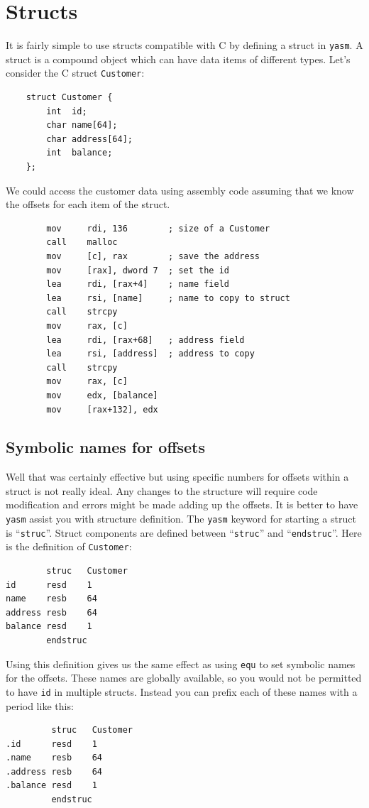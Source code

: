 \documentclass[11pt,b5paper]{book}
\begin{document}
\chapter{Structs}

It is fairly simple to use structs compatible with C by defining a struct in {\tt yasm}. 
A struct is a compound object which can have data items of different types.
Let's consider the C struct {\tt Customer}:
\begin{verbatim}
    struct Customer {
        int  id;
        char name[64];
        char address[64];
        int  balance;
    };
\end{verbatim}

We could access the customer data using assembly code assuming that we know the offsets for each item of the
struct.
\begin{verbatim}
        mov     rdi, 136        ; size of a Customer
        call    malloc
        mov     [c], rax        ; save the address
        mov     [rax], dword 7  ; set the id
        lea     rdi, [rax+4]    ; name field
        lea     rsi, [name]     ; name to copy to struct
        call    strcpy
        mov     rax, [c]
        lea     rdi, [rax+68]   ; address field
        lea     rsi, [address]  ; address to copy
        call    strcpy
        mov     rax, [c]
        mov     edx, [balance]
        mov     [rax+132], edx
\end{verbatim}

\section{Symbolic names for offsets}

Well that was certainly effective but using specific numbers for offsets within a struct is not really ideal.
Any changes to the structure will require code modification and errors might be made adding up the offsets.
It is better to have {\tt yasm} assist you with structure definition.
The {\tt yasm} keyword for starting a struct is ``{\tt struc}''.
Struct components are defined between ``{\tt struc}'' and ``{\tt endstruc}''.
Here is the definition of {\tt Customer}:
\begin{verbatim}
        struc   Customer
id      resd    1
name    resb    64
address resb    64
balance resd    1
        endstruc
\end{verbatim}
Using this definition gives us the same effect as using {\tt equ} to set symbolic names for the offsets.
These names are globally available, so you would not be permitted to have {\tt id} in multiple structs.
Instead you can prefix each of these names with a period like this:
\begin{verbatim}
         struc   Customer
.id      resd    1
.name    resb    64
.address resb    64
.balance resd    1
         endstruc
\end{verbatim}
\end{document}

